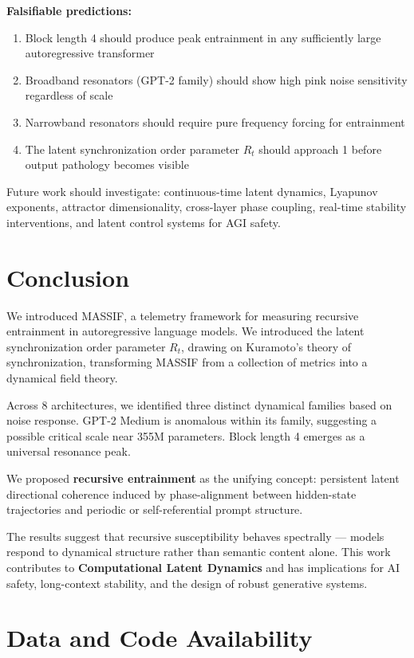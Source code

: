\documentclass{article}
\begin{document}
\textbf{Falsifiable predictions:}
\begin{enumerate}
    \item Block length 4 should produce peak entrainment in any sufficiently large autoregressive transformer
    \item Broadband resonators (GPT-2 family) should show high pink noise sensitivity regardless of scale
    \item Narrowband resonators should require pure frequency forcing for entrainment
    \item The latent synchronization order parameter $R_t$ should approach 1 before output pathology becomes visible
\end{enumerate}

Future work should investigate: continuous-time latent dynamics, Lyapunov exponents, attractor dimensionality, cross-layer phase coupling, real-time stability interventions, and latent control systems for AGI safety.

\section{Conclusion}

We introduced MASSIF, a telemetry framework for measuring recursive entrainment in autoregressive language models. We introduced the latent synchronization order parameter $R_t$, drawing on Kuramoto's theory of synchronization, transforming MASSIF from a collection of metrics into a dynamical field theory.

Across 8 architectures, we identified three distinct dynamical families based on noise response. GPT-2 Medium is anomalous within its family, suggesting a possible critical scale near 355M parameters. Block length 4 emerges as a universal resonance peak.

We proposed \textbf{recursive entrainment} as the unifying concept: persistent latent directional coherence induced by phase-alignment between hidden-state trajectories and periodic or self-referential prompt structure.

The results suggest that recursive susceptibility behaves spectrally — models respond to dynamical structure rather than semantic content alone. This work contributes to \textbf{Computational Latent Dynamics} and has implications for AI safety, long-context stability, and the design of robust generative systems.

\section*{Data and Code Availability}
\end{document}
